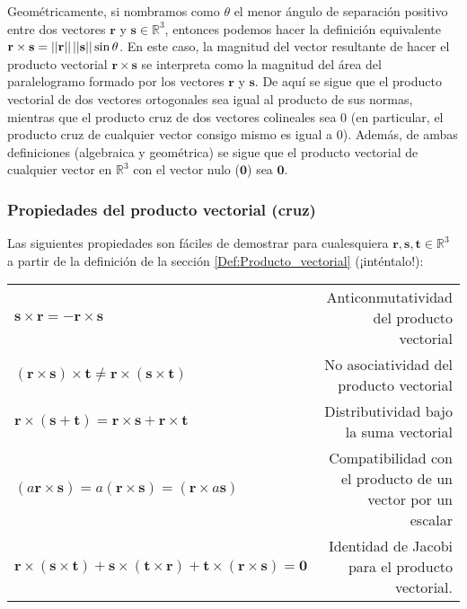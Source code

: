 \documentclass[notasLineal]{subfile}
\begin{document}
Geométricamente, si nombramos como $\theta$ el menor ángulo de separación positivo entre dos vectores $\mathbf{r}$ y $\mathbf{s}\in\mathbb{R}^3$, entonces podemos hacer la definición equivalente $\mathbf{r}\times\mathbf{s}=||\mathbf{r}|| \hspace{0.5mm}  ||\mathbf{s}||\sin\theta$. En este caso, la magnitud del vector resultante de hacer el producto vectorial $\mathbf{r}\times\mathbf{s}$ se interpreta como la magnitud del área del paralelogramo formado por los vectores $\mathbf{r}$ y $\mathbf{s}$. De aquí se sigue que el producto vectorial de dos vectores ortogonales sea igual al producto de sus normas, mientras que el producto cruz de dos vectores colineales sea $0$ (en particular, el producto cruz de cualquier vector consigo mismo es igual a $0$). Además, de ambas definiciones (algebraica y geométrica) se sigue que el producto vectorial de cualquier vector en $\mathbb{R}^3$ con el vector nulo ($\mathbf{0}$) sea $\mathbf{0}$.

\subsubsection{Propiedades del producto vectorial (cruz)} \label{Prop:Producto_vectorial}

Las siguientes propiedades son fáciles de demostrar para cualesquiera $\mathbf{r},\mathbf{s},\mathbf{t}\in\mathbb{R}^3$ a partir de la definición de la sección \ref{Def:Producto_vectorial} (¡inténtalo!):

\begin{center}
\begin{tabular}{lr}
    $\mathbf{s}\times\mathbf{r} = -\mathbf{r}\times\mathbf{s}$ & Anticonmutatividad del producto vectorial \\
    $(\mathbf{r}\times\mathbf{s})\times\mathbf{t}\neq\mathbf{r}\times(\mathbf{s}\times\mathbf{t})$ & No asociatividad del producto vectorial \\
    $\mathbf{r}\times(\mathbf{s}+\mathbf{t}) = \mathbf{r}\times\mathbf{s}+\mathbf{r}\times\mathbf{t}$ & Distributividad bajo la suma vectorial \\
    $(a\mathbf{r}\times\mathbf{s}) = a(\mathbf{r}\times\mathbf{s})=(\mathbf{r}\times a\mathbf{s})$ & Compatibilidad con el producto de un vector por un escalar\\
    $\mathbf{r}\times(\mathbf{s}\times\mathbf{t})+\mathbf{s}\times(\mathbf{t}\times\mathbf{r})+\mathbf{t}\times(\mathbf{r}\times\mathbf{s}) = \mathbf{0}$ & Identidad de Jacobi para el producto vectorial.
\end{tabular}
\end{center}
\end{document}
